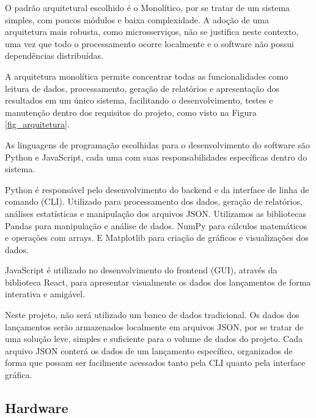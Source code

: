 \begin{samepage}
O padrão arquitetural escolhido é o Monolítico, por se tratar de um sistema simples, com poucos módulos e baixa complexidade. A adoção de uma arquitetura mais robusta, como microsserviços, não se justifica neste contexto, uma vez que todo o processamento ocorre localmente e o software não possui dependências distribuídas. 

A arquitetura monolítica permite concentrar todas as funcionalidades como leitura de dados, processamento, geração de relatórios e apresentação dos resultados em um único sistema, facilitando o desenvolvimento, testes e manutenção dentro dos requisitos do projeto, como visto na Figura \ref{fig_arquitetura}.


As linguagens de programação escolhidas para o desenvolvimento do software são Python e JavaScript, cada uma com suas responsabilidades específicas dentro do sistema.

Python é responsável pelo desenvolvimento do backend e da interface de linha de comando (CLI). Utilizado para processamento dos dados, geração de relatórios, análises estatísticas e manipulação dos arquivos JSON. Utilizamos as bibliotecas Pandas para manipulação e análise de dados. NumPy para cálculos matemáticos e operações com arrays. E Matplotlib para criação de gráficos e visualizações dos dados.

JavaScript é utilizado no desenvolvimento do frontend (GUI), através da biblioteca React, para apresentar visualmente os dados dos lançamentos de forma interativa e amigável.

Neste projeto, não será utilizado um banco de dados tradicional. Os dados dos lançamentos serão armazenados localmente em arquivos JSON, por se tratar de uma solução leve, simples e suficiente para o volume de dados do projeto. Cada arquivo JSON conterá os dados de um lançamento específico, organizados de forma que possam ser facilmente acessados tanto pela CLI quanto pela interface gráfica.

\end{samepage}


\subsection{Hardware}

